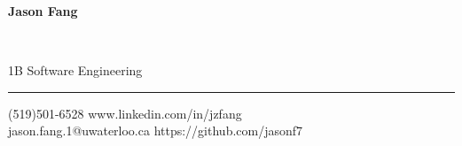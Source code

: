 \documentclass[10pt]{article}
\begin{document}
\thispagestyle{empty}

\begin{center}
\begin{LARGE}\textbf{Jason Fang}\end{LARGE}\\
\vspace{2pt}
\begin{normalsize}1B Software Engineering\end{normalsize} 
\vspace{-10pt}
\end{center}

\rule{475pt}{1pt}
(519)501-6528 \hspace{3.5in} www.linkedin.com/in/jzfang\\ 
jason.fang.1@uwaterloo.ca\hspace{2.75in} https://github.com/jasonf7\\
\vspace{12pt}
\end{document}
